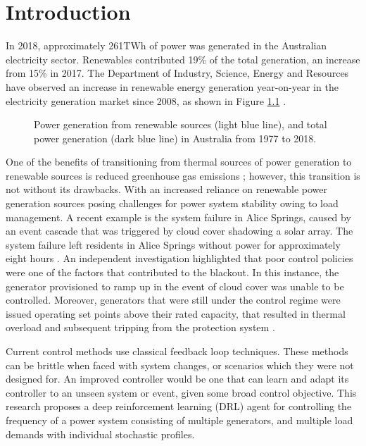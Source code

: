 \chapter{Introduction}
In 2018, approximately 261$\si{\tera\watt\hour}$ of power was generated in the Australian electricity sector. Renewables contributed 19\% of the total generation, an increase from 15\% in 2017. The Department of Industry, Science, Energy and Resources have observed an increase in renewable energy generation year-on-year in the electricity generation market since 2008, as shown in Figure \ref{fig:energyts} \cite{Diser2020}.\\

\begin{figure}[ht]
	\centering
	
	\caption{Power generation from renewable sources (light blue line), and total power generation (dark blue line) in Australia from 1977 to 2018.}
	\label{fig:energyts}
\end{figure}

One of the benefits of transitioning from thermal sources of power generation to renewable sources is reduced greenhouse gas emissions \cite{IPCC2012}; however, this transition is not without its drawbacks. With an increased reliance on renewable power generation sources posing challenges for power system stability owing to load management. A recent example is the system failure in Alice Springs, caused by an event cascade that was triggered by cloud cover shadowing a solar array. The system failure left residents in Alice Springs without power for approximately eight hours \cite{UCNT2019}. An independent investigation highlighted that poor control policies were one of the factors that contributed to the blackout. In this instance, the generator provisioned to ramp up in the event of cloud cover was unable to be controlled. Moreover, generators that were still under the control regime were issued operating set points above their rated capacity, that resulted in thermal overload and subsequent tripping from the protection system \cite{Wilkey2019}.

Current control methods use classical feedback loop techniques. These methods can be brittle when faced with system changes, or scenarios which they were not designed for. An improved controller would be one that can learn and adapt its controller to an unseen system or event, given some broad control objective. This research proposes a deep reinforcement learning (DRL) agent for controlling the frequency of a power system consisting of multiple generators, and multiple load demands with individual stochastic profiles.

